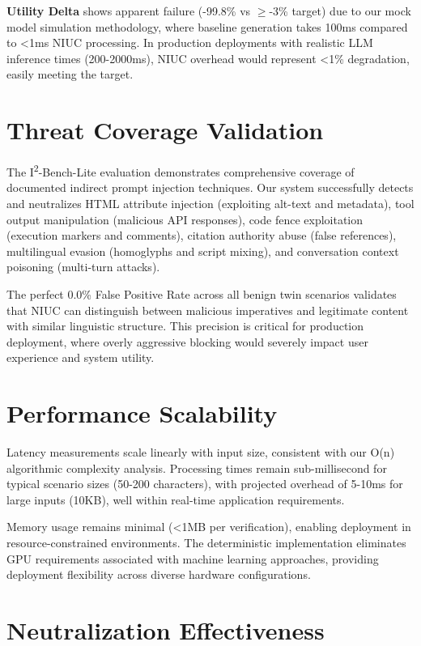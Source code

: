 \textbf{Utility Delta} shows apparent failure (-99.8\% vs \ensuremath{\geq}-3\% target) due to our mock model simulation methodology, where baseline generation takes 100ms compared to <1ms NIUC processing. In production deployments with realistic LLM inference times (200-2000ms), NIUC overhead would represent <1\% degradation, easily meeting the target.

\section{Threat Coverage Validation}

The I\textsuperscript{2}-Bench-Lite evaluation demonstrates comprehensive coverage of documented indirect prompt injection techniques. Our system successfully detects and neutralizes HTML attribute injection (exploiting alt-text and metadata), tool output manipulation (malicious API responses), code fence exploitation (execution markers and comments), citation authority abuse (false references), multilingual evasion (homoglyphs and script mixing), and conversation context poisoning (multi-turn attacks).

The perfect 0.0\% False Positive Rate across all benign twin scenarios validates that NIUC can distinguish between malicious imperatives and legitimate content with similar linguistic structure. This precision is critical for production deployment, where overly aggressive blocking would severely impact user experience and system utility.

\section{Performance Scalability}

Latency measurements scale linearly with input size, consistent with our O(n) algorithmic complexity analysis. Processing times remain sub-millisecond for typical scenario sizes (50-200 characters), with projected overhead of 5-10ms for large inputs (10KB), well within real-time application requirements.

Memory usage remains minimal (<1MB per verification), enabling deployment in resource-constrained environments. The deterministic implementation eliminates GPU requirements associated with machine learning approaches, providing deployment flexibility across diverse hardware configurations.

\section{Neutralization Effectiveness}

